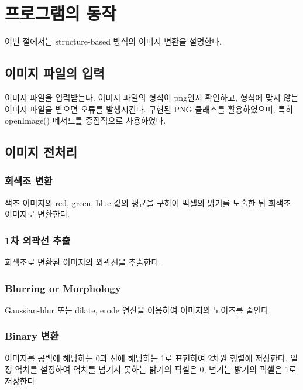 \documentclass[conference]{IEEEtran}
\begin{document}
\subsubsection{\structure}

\section{프로그램의 동작}

이번 절에서는 structure-based 방식의 이미지 변환을 설명한다.

\subsection{이미지 파일의 입력}

이미지 파일을 입력받는다. 이미지 파일의 형식이 png인지 확인하고, 형식에 맞지 않는 이미지 파일을 받으면 오류를 발생시킨다.
 구현된 PNG 클래스를 활용하였으며, 특히 openImage() 메서드를 중점적으로 사용하였다.

\subsection{이미지 전처리}

\subsubsection{회색조 변환}

색조 이미지의 red, green, blue 값의 평균을 구하여 픽셀의 밝기를 도출한 뒤 회색조 이미지로 변환한다.

\subsubsection{1차 외곽선 추출}

회색조로 변환된 이미지의 외곽선을 추출한다.

\subsubsection{Blurring or Morphology}

Gaussian-blur 또는 dilate, erode 연산을 이용하여 이미지의 노이즈를 줄인다.

\subsubsection{Binary 변환}

이미지를 공백에 해당하는 0과 선에 해당하는 1로 표현하여 2차원 행렬에 저장한다.
일정 역치를 설정하여 역치를 넘기지 못하는 밝기의 픽셀은 0, 넘기는 밝기의 픽셀은 1로 저장한다.
\end{document}

